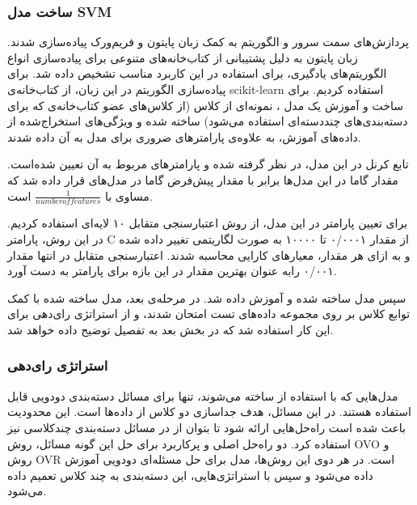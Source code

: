 		
		\subsubsection{ساخت مدل SVM}
پردازش‌های سمت سرور و الگوریتم  به کمک زبان پایتون و فریم‌ورک  پیاده‌سازی شدند. زبان پایتون به دلیل پشتیبانی از کتاب‌خانه‌های متنوعی برای پیاده‌سازی انواع الگوریتم‌های یادگیری، برای استفاده در این کاربرد مناسب تشخیص داده شد. برای پیاده‌سازی الگوریتم  در این زبان، از کتاب‌خانه‌ی scikit-learn استفاده کردیم. برای ساخت و آموزش یک مدل ، نمونه‌ای از کلاس  (از کلاس‌های عضو کتاب‌خانه‌ی  که برای دسته‌بندی‌های چنددسته‌ای استفاده می‌شود) ساخته شده و ویژگی‌های استخراج‌شده از داده‌های آموزش، به علاوه‌ی پارامترهای ضروری برای مدل  به آن داده شدند. 

	تابع کرنل در این مدل،  در نظر گرفته شده و پارامترهای مربوط به آن تعیین شده‌است. مقدار گاما در این مدل‌ها برابر با مقدار پیش‌فرض گاما در مدل‌های  قرار داده شد که مساوی با $\frac{1}{number of features}$ است.
	
برای تعیین پارامتر  در این مدل، از روش اعتبارسنجی متقابل ۱۰ لایه‌ای استفاده کردیم. در این روش، پارامتر C از مقدار ۰/۰۰۰۱ تا ۱۰۰۰۰ به صورت لگاریتمی تغییر داده شده و به ازای هر مقدار، معیارهای کارایی محاسبه شدند. اعتبارسنجی متقابل در انتها مقدار ۰/۰۰۱ رابه عنوان بهترین مقدار در این بازه برای پارامتر  به دست آورد.
 
سپس مدل ساخته شده و آموزش داده شد. در مرحله‌ی بعد، مدل ساخته شده با کمک توابع کلاس  بر روی مجموعه‌ داده‌های تست امتحان شدند، و از استراتژی رای‌دهی  برای این کار استفاده شد که در بخش بعد به تفصیل توضیح داده خواهد شد.
	
		\subsubsection{استراتژی رای‌دهی}
		مدل‌هایی که با استفاده از  ساخته می‌شوند، تنها برای مسائل دسته‌بندی دودویی قابل استفاده هستند. در این مسائل، هدف جداسازی دو کلاس از داده‌ها است. این محدودیت باعث شده است راه‌حل‌هایی ارائه شود تا بتوان از  در مسائل دسته‌بندی چندکلاسی نیز استفاده کرد. دو راه‌حل اصلی و پرکاربرد برای حل این گونه مسائل، روش OVO و روش OVR است. در هر دوی این روش‌ها، مدل  برای حل مسئله‌ای دودویی آموزش داده می‌شود و سپس با استراتژی‌هایی،‌ این دسته‌بندی به چند کلاس تعمیم داده می‌شود.
		 
